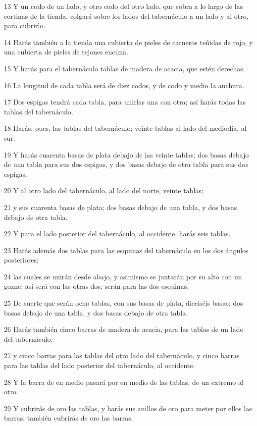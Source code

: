 \par 13 Y un codo   de un lado, y otro codo del otro lado, que sobra a lo largo de las cortinas de la tienda, colgará sobre los lados del tabernáculo a un lado y al otro, para cubrirlo.
\par 14 Harás también a la tienda una cubierta de pieles de carneros teñidas de rojo, y una cubierta de pieles de tejones encima.
\par 15 Y harás para el tabernáculo tablas de madera de acacia, que estén derechas.
\par 16 La longitud de cada tabla será de diez codos,  y de codo y medio la anchura.
\par 17 Dos espigas tendrá cada tabla, para unirlas una con otra; así harás todas las tablas del tabernáculo.
\par 18 Harás, pues, las tablas del tabernáculo; veinte tablas al lado del mediodía, al sur.
\par 19 Y harás cuarenta basas de plata debajo de las veinte tablas; dos basas debajo de una tabla para sus dos espigas, y dos basas debajo de otra tabla para sus dos espigas.
\par 20 Y al otro lado del tabernáculo, al lado del norte, veinte tablas;
\par 21 y sus cuarenta basas de plata; dos basas debajo de una tabla, y dos basas debajo de otra tabla.
\par 22 Y para el lado posterior del tabernáculo, al occidente, harás seis tablas.
\par 23 Harás además dos tablas para las esquinas del tabernáculo en los dos ángulos posteriores;
\par 24 las cuales se unirán desde abajo, y asimismo se juntarán por su alto con un gozne; así será con las otras dos; serán para las dos esquinas.
\par 25 De suerte que serán ocho tablas, con sus basas de plata, dieciséis basas; dos basas debajo de una tabla, y dos basas debajo de otra tabla.
\par 26 Harás también cinco barras de madera de acacia, para las tablas de un lado del tabernáculo,
\par 27 y cinco barras para las tablas del otro lado del tabernáculo, y cinco barras para las tablas del lado posterior del tabernáculo, al occidente.
\par 28 Y la barra de en medio pasará por en medio de las tablas, de un extremo al otro.
\par 29 Y cubrirás de oro las tablas, y harás sus anillos de oro para meter por ellos las barras; también cubrirás de oro las barras.
